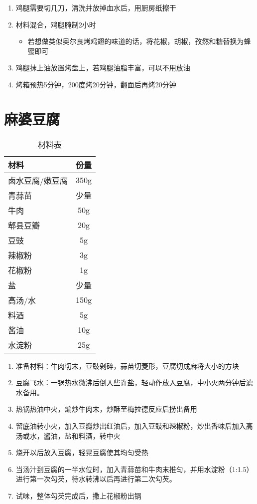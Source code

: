 \begin{enumerate}
    \item 鸡腿需要切几刀，清洗并放掉血水后，用厨房纸擦干
    \item 材料混合，鸡腿腌制2小时
    \begin{itemize}
        \item 若想做类似奥尔良烤鸡翅的味道的话，将花椒，胡椒，孜然和糖替换为蜂蜜即可
    \end{itemize}
    \item 鸡腿抹上油放置烤盘上，若鸡腿油脂丰富，可以不用放油
    \item 烤箱预热5分钟，200度烤20分钟，翻面后再烤20分钟
\end{enumerate}


\section{麻婆豆腐}

\begin{table}[H]
    \centering
    \begin{tabular}{|l||c|}\hline
     \textbf{材料}    &  \textbf{份量}\\ \hline\hline
    卤水豆腐/嫩豆腐    &  350g  \\ \hline
    青蒜苗    &  少量 \\ \hline
    牛肉    & 50g \\ \hline
    郫县豆瓣    & 20g \\ \hline
    豆豉    & 5g \\ \hline
    辣椒粉    & 3g \\ \hline
    花椒粉    & 1g \\ \hline
    盐    & 少量 \\ \hline
    高汤/水 & 150g \\ \hline
    料酒    & 5g \\ \hline
    酱油    & 10g \\ \hline
    水淀粉    &  25g \\ \hline
    \end{tabular}
    \caption{材料表}
\end{table}

\begin{enumerate}
    \item 准备材料：牛肉切末，豆豉剁碎，蒜苗切菱形，豆腐切成麻将大小的方块
    \item 豆腐飞水：一锅热水微沸后倒入些许盐，轻动作放入豆腐，中小火两分钟后滤水备用。
    \item 热锅热油中火，煸炒牛肉末，炒酥至梅拉德反应后捞出备用
    \item 留底油转小火，加入豆瓣炒出红油后，加入豆豉和辣椒粉，炒出香味后加入高汤或水，酱油，盐和料酒，转中火
    \item 烧开以后放入豆腐，轻晃豆腐使其均匀受热
    \item 当汤汁到豆腐的一半水位时，加入青蒜苗和牛肉末推匀，并用水淀粉（1:1.5）进行第一次勾芡，待水转沸以后再进行第二次勾芡。
    \item 试味，整体勾芡完成后，撒上花椒粉出锅
\end{enumerate}


